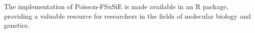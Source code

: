 The implementation of Poisson-FSuSiE is made available in an R package, providing a valuable resource for researchers in the fields of molecular biology and genetics.








